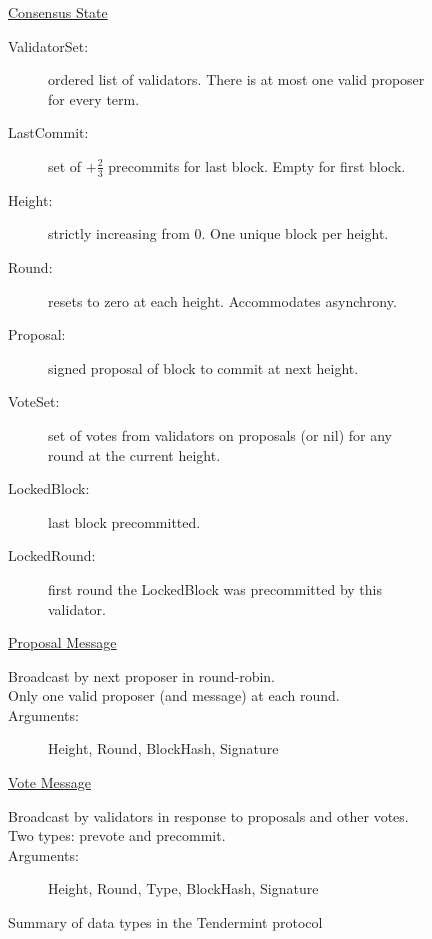 \begin{figure}[]
	\underline{Consensus State}
		\begin{description}
			\item[ValidatorSet:] ordered list of validators. There is at most one valid proposer for every term.
			\item[LastCommit:] set of $+\frac{2}{3}$ precommits for last block. Empty for first block.
			\item[Height:] strictly increasing from 0. One unique block per height.
			\item[Round:] resets to zero at each height. Accommodates asynchrony. 
			\item[Proposal:] signed proposal of block to commit at next height.
			\item[VoteSet:] set of votes from validators on proposals (or nil) for any round at the current height.
			\item[LockedBlock:] last block precommitted.
			\item[LockedRound:] first round the LockedBlock was precommitted by this validator.
		\end{description}

	\underline{Proposal Message}
		\begin{description}
			\item[Broadcast by next proposer in round-robin.]
			\item[Only one valid proposer (and message) at each round.]
			\item[Arguments:] Height, Round, BlockHash, Signature
		\end{description}

	\underline{Vote Message}
		\begin{description}
			\item[Broadcast by validators in response to proposals and other votes.]
			\item[Two types: prevote and precommit.]
			\item[Arguments:] Height, Round, Type, BlockHash, Signature
		\end{description}

	\caption[Summary of tendermint protocol]{Summary of data types in the Tendermint protocol}
	\label{fig:tendermint_summary}
\end{figure}


